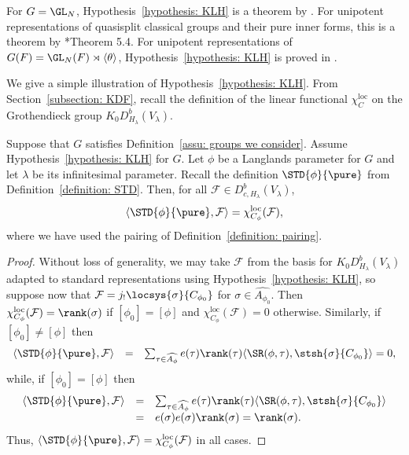 \documentclass[11pt,letterpaper]{amsart}
\numberwithin{equation}{section}
\begin{document}
\begin{remark}\label{remark: KLH status}
    For $G=\GL_N$,  Hypothesis~\ref{hypothesis: KLH} is a theorem by \cite{bal25}.
    For unipotent representations of quasisplit classical groups and their pure inner forms, this is a theorem by \cite{Sol25}*{Theorem 5.4}.
        For unipotent representations of $G(F) = \GL_N(F)\rtimes{\langle\theta\rangle}$, Hypothesis~\ref{hypothesis: KLH} is proved in \cite{CHAI}.
\end{remark}




We give a simple illustration of Hypothesis~\ref{hypothesis: KLH}.
From Section~\ref{subsection: KDF}, recall the definition of the linear functional $\chi^\textrm{loc}_C$ on the Grothendieck group $K_0 D^b_{H_\lambda}(V_\lambda)$.

\begin{lemma}\label{lemma: mu and chiloc}
Suppose that $G$ satisfies Definition~\ref{assu: groups we consider}. 
Assume Hypothesis~\ref{hypothesis: KLH} for $G$. 
Let $\phi$ be a Langlands parameter for $G$ and let $\lambda$ be its infinitesimal parameter.
Recall the definition $\STD{\phi}{\pure}$ from Definition~\ref{definition: STD}.
Then, for all $\mathcal{F} \in D^b_{c,H_\lambda}(V_\lambda)$,
\[
\langle \STD{\phi}{\pure}, \mathcal{F} \rangle
=
\chi^\textrm{loc}_{C_\phi}(\mathcal{F}),
\]
 where we have used the pairing of Definition~\ref{definition: pairing}.
\end{lemma} 

\begin{proof}
Without loss of generality, we may take  $\mathcal{F}$ from the basis for $K_0 D^b_{H_\lambda}(V_\lambda)$ adapted to standard representations using Hypothesis~\ref{hypothesis: KLH}, so suppose now that $\mathcal{F} =  j_!\locsys{\sigma}{C_{\phi_0}}$ for $\sigma \in \widehat{A_{\phi_0}}$. 
Then $\chi^{\textrm{loc}}_{C_\phi}(\mathcal{F}) = \rank(\sigma)$ if $[\phi_0] = [\phi]$ and $\chi^{\textrm{loc}}_{C_\phi}(\mathcal{F}) = 0$ otherwise. Similarly, if $[\phi_0] \ne [\phi]$ then
\[
\begin{array}{rcl}
\langle
\STD{\phi}{\pure}, \mathcal{F}
\rangle
&=&
\sum_{\tau\in \widehat{A_\phi}} e(\tau) \rank(\tau) 
	\langle \SR(\phi,\tau), \stsh{\sigma}{C_{\phi_0}} \rangle  = 0,
\end{array}
\]
while, if $[\phi_0] = [\phi]$ then
\[
\begin{array}{rcl}
\langle
\STD{\phi}{\pure}, \mathcal{F}
\rangle
&=&
\sum_{\tau\in \widehat{A_\phi}} e(\tau) \rank(\tau) 
	\langle \SR(\phi,\tau), \stsh{\sigma}{C_{\phi_0}} \rangle \\
&=& 	e(\sigma) e(\sigma) \rank(\sigma) = \rank(\sigma). 
\end{array}
\]
Thus,  $\langle
\STD{\phi}{\pure}, \mathcal{F}
\rangle 
= \chi^{\textrm{loc}}_{C_\phi}(\mathcal{F})$ in all cases. 
\end{proof}
\end{document}
